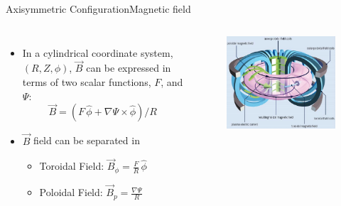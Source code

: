 \documentclass{beamer}
\begin{document}
\begin{frame}{Axisymmetric Configuration}{Magnetic field}

\begin{columns}
   \begin{itemize}
   \item In a cylindrical coordinate system,  $(R, Z, \phi)$,   $\vec{B}$
   can be expressed in terms of two scalar functions, $F$, and $\Psi$:
    \begin{equation*}%
		 \vec{B} =  (F \,  \hat{\phi}  + \nabla \Psi \times \hat{\phi} )/ R 
	\end{equation*}
	\item<2-> $\vec{B}$ field can be separated in
		\begin{itemize}
			\item Toroidal Field: $\vec{B}_{\phi} = \frac{F}{R}\, \hat{\phi} $
			\item Poloidal Field: $\vec{B}_{p} = \frac{\nabla \Psi}{R}  $
		\end{itemize}

   \end{itemize}
	\begin{figure}[ht]
	\begin{center}
	\includegraphics[width=1.2\columnwidth]{magAxis.png}
	\end{center}
	\end{figure}
\end{columns}	
\end{frame}
\end{document}
